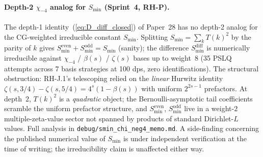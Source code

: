 \documentclass[11pt]{article}
\begin{document}
\paragraph{Depth-2 $\chi_{-4}$ analog for $S_{\min}$
(Sprint~4, RH-P).}  The depth-1 identity~(\ref{eq:D_diff_closed})
of Paper~28 has no depth-2 analog for the CG-weighted irreducible
constant $S_{\min}$.  Splitting $S_{\min} = \sum_k T(k)^2$ by the
parity of $k$ gives $S_{\min}^{\mathrm{even}} + S_{\min}^{\mathrm{odd}} =
S_{\min}$ (sanity); the difference $S_{\min}^{\mathrm{diff}}$ is
numerically irreducible against $\chi_{-4}$ / $\beta(s)$ /
$\zeta(s)$ bases up to weight~$8$ (35 PSLQ attempts across 7 basis
strategies at 100 dps, zero identifications). The structural
obstruction: RH-J.1's telescoping relied on the \emph{linear}
Hurwitz identity $\zeta(s, 3/4) - \zeta(s, 5/4) = 4^s(1 - \beta(s))$
with uniform $2^{2s-1}$ prefactors.  At depth~$2$, $T(k)^2$ is a
\emph{quadratic} object; the Bernoulli-asymptotic tail coefficients
scramble the uniform prefactor structure, and $S_{\min}^{\mathrm{even}}$,
$S_{\min}^{\mathrm{odd}}$ live in a weight-$2$ multiple-zeta-value
sector not spanned by products of standard Dirichlet-$L$ values.
Full analysis in \texttt{debug/smin\_chi\_neg4\_memo.md}.  A
side-finding concerning the published numerical value of $S_{\min}$
is under independent verification at the time of writing; the
irreducibility claim is unaffected either way.
\end{document}
